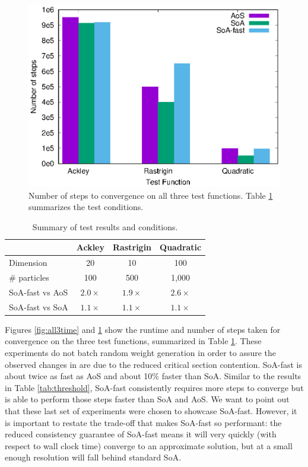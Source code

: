 \begin{figure}
  \includegraphics[width=\columnwidth]{../img/output/all3steps}
  \caption{Number of steps to convergence on all three test functions. Table \ref{tab:results}
    summarizes the test conditions.}
  \label{fig:all3steps}
\end{figure}

\begin{table}
  \centering
  \caption{Summary of test results and conditions.}
  \label{tab:results}
  \begin{tabular}{lccc}\toprule
    & \textbf{Ackley} & \textbf{Rastrigin} & \textbf{Quadratic}\\\midrule
    Dimension & 20 & 10 & 100\\
    \# particles & 100 & 500 & 1,000\\
    SoA-fast vs AoS & $2.0\times$ & $1.9\times$ & $2.6\times$\\
    SoA-fast vs SoA & $1.1\times$ & $1.1\times$ & $1.1\times$\\\bottomrule
  \end{tabular}
\end{table}

Figures \ref{fig:all3time} and \ref{fig:all3steps} show the runtime and number
of steps taken for convergence on the three test functions, summarized in Table
\ref{tab:results}.
These experiments do not batch random weight generation in order to assure the
observed changes in are due to the reduced critical section contention.
SoA-fast is about twice as fast as AoS  and
about 10\% faster than  SoA. Similar to the results in Table
\ref{tab:threshold}, SoA-fast consistently requires more steps to converge but
is able to perform those steps faster than SoA and AoS. We want to point out
that these last set of experiments were chosen to showcase SoA-fast.
However, it is important to restate the trade-off that makes SoA-fast so performant: the reduced
consistency guarantee of SoA-fast means it will very quickly (with respect to
wall clock time) converge to an approximate solution, but at a small enough
resolution will fall behind standard SoA.

